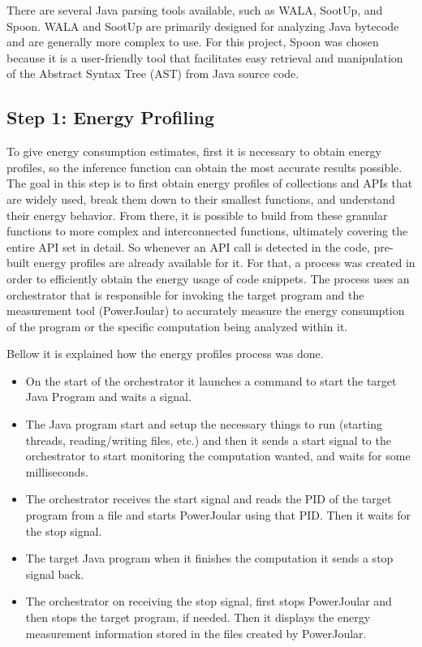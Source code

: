 \documentclass[sigplan]{acmart}
\begin{document}
There are several Java parsing tools available, such as WALA\cite{wala_main}, SootUp\cite{sootup_main}, and Spoon\cite{spoon_main}. WALA and SootUp are primarily designed for analyzing Java bytecode and are generally more complex to use. For this project, Spoon was chosen because it is a user-friendly tool that facilitates easy retrieval and manipulation of the Abstract Syntax Tree (AST) from Java source code.

\subsection{Step 1: Energy Profiling} \label{sec:work_step1_energy_profiling}

To give energy consumption estimates, first it is necessary to obtain energy profiles, so the inference function can obtain the most accurate results possible. The goal in this step is to first obtain energy profiles of collections and APIs that are widely used, break them down to their smallest functions, and understand their energy behavior. From there, it is possible to build from these granular functions to more complex and interconnected functions, ultimately covering the entire API set in detail. So whenever an API call is detected in the code, pre-built energy profiles are already available for it.
For that, a process was created in order to efficiently obtain the energy usage of code snippets.
The process uses an orchestrator that is responsible for invoking the target program and the measurement tool (PowerJoular) to accurately measure the energy consumption of the program or the specific computation being analyzed within it.

Bellow it is explained how the energy profiles process was done.

\begin{itemize}
  \item On the start of the orchestrator it launches a command to start the target Java Program and waits a signal.
  \item The Java program start and setup the necessary things to run (starting threads, reading/writing files, etc.) and then it sends a start signal to the orchestrator to start monitoring the computation wanted, and waits for some milliseconds. 
  \item The orchestrator receives the start signal and reads the PID of the target program from a file and starts PowerJoular using that PID. Then it waits for the stop signal.
  \item The target Java program when it finishes the computation it sends a stop signal back.
  \item The orchestrator on receiving the stop signal, first stops PowerJoular and then stops the target program, if needed. Then it displays the energy measurement information stored in the files created by PowerJoular. \\
\end{itemize}
\end{document}
